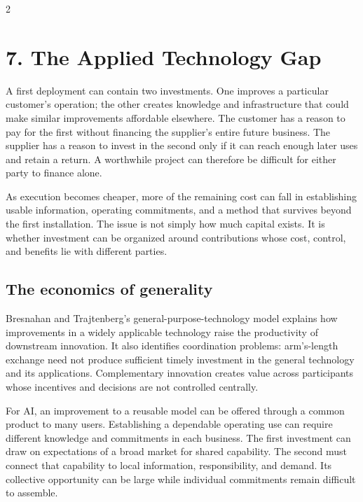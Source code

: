 \ComplementaryAssetsArt

\clearpage
\begin{multicols}{2}

\section{7. The Applied Technology
Gap}\label{the-applied-technology-gap}

A first deployment can contain two investments. One improves a
particular customer's operation; the other creates knowledge and
infrastructure that could make similar improvements affordable
elsewhere. The customer has a reason to pay for the first without
financing the supplier's entire future business. The supplier has a
reason to invest in the second only if it can reach enough later uses
and retain a return. A worthwhile project can therefore be difficult for
either party to finance alone.

As execution becomes cheaper, more of the remaining cost can fall in
establishing usable information, operating commitments, and a method
that survives beyond the first installation. The issue is not simply how
much capital exists. It is whether investment can be organized around
contributions whose cost, control, and benefits lie with different
parties.

\subsection{The economics of
generality}\label{the-economics-of-generality}

Bresnahan and Trajtenberg's general-purpose-technology model
\citep{bresnahan1995gpt} explains how improvements in a widely
applicable technology raise the productivity of downstream innovation.
It also identifies coordination problems: arm's-length exchange need not
produce sufficient timely investment in the general technology and its
applications. Complementary innovation creates value across participants
whose incentives and decisions are not controlled centrally.

For AI, an improvement to a reusable model can be offered through a
common product to many users. Establishing a dependable operating use
can require different knowledge and commitments in each business. The
first investment can draw on expectations of a broad market for shared
capability. The second must connect that capability to local
information, responsibility, and demand. Its collective opportunity can
be large while individual commitments remain difficult to assemble.


\end{multicols}
